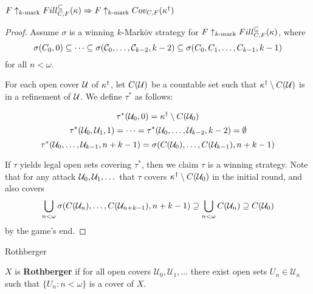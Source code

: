   \begin{theorem}
    $F\uparrow_{k\text{-mark}}Fill^{\subseteq}_{C,F}(\kappa) \Rightarrow F\uparrow_{k\text{-mark}}Cov_{C,F}(\kappa^\dagger)$
  \end{theorem}

  \begin{proof}
    Assume $\sigma$ is a winning $k$-Mark\"ov strategy for $F\uparrow_{k\text{-mark}}Fill^{\subseteq}_{C,F}(\kappa)$, where 
      \[
        \sigma(C_0,0)\subseteq
        \dots \subseteq
        \sigma(\mathcal{C}_0,\dots,\mathcal{C}_{k-2},k-2) \subseteq
        \sigma(C_0,C_1,\dots,C_{k-1},k-1)
      \]
    for all $n<\omega$.

    For each open cover $\mathcal{U}$ of $\kappa^\dagger$, let $C(\mathcal{U})$ be a countable set such that $\kappa^\dagger\setminus C(\mathcal{U})$ is in a refinement of $\mathcal{U}$. We define $\tau^*$ as follows:

      \[
        \tau^*(\mathcal{U}_0,0) =
        \kappa^\dagger\setminus C(\mathcal{U}_0)
      \]
      \[
        \tau^*(\mathcal{U}_0,\mathcal{U}_1,1) =
        \dots =
        \tau^*(\mathcal{U}_0,\dots,\mathcal{U}_{k-2},k-2) =
        \emptyset
      \]
      \[
        \tau^*(\mathcal{U}_0,\dots,\mathcal{U}_{k-1},n+k-1) = 
        \sigma(C(\mathcal{U}_0),\dots,C(\mathcal{U}_{k-1}),n+k-1)
      \]

    If $\tau$ yields legal open sets covering $\tau^*$, then we claim $\tau$ is a winning strategy. Note that for any attack $\mathcal{U}_0,\mathcal{U}_1,\dots$ that $\tau$ covers $\kappa^\dagger\setminus C(\mathcal{U}_0)$ in the initial round, and also covers
      \[
        \bigcup_{n<\omega}\sigma(C(\mathcal{U}_n),\dots,C(\mathcal{U}_{n+k-1}),n+k-1) \supseteq
        \bigcup_{n<\omega} C(\mathcal{U}_n) \supseteq
        C(\mathcal{U}_0)
      \]
    by the game's end.
  \end{proof}

















\newpage

  \centerline{Rothberger}

  \begin{definition}
    $X$ is \textbf{Rothberger} if for all open covers $\mathcal{U}_0,\mathcal{U}_1,\dots$ there exist open sets $U_n\in \mathcal{U}_n$ such that $\{U_n:n<\omega\}$ is a cover of $X$.
  \end{definition}

